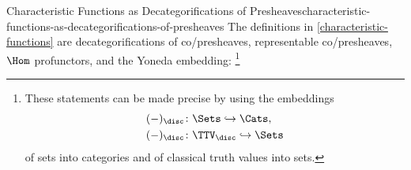\begin{remark}{Characteristic Functions as Decategorifications of Presheaves}{characteristic-functions-as-decategorifications-of-presheaves}%
    The definitions in \cref{characteristic-functions} are decategorifications of co/presheaves, representable co/presheaves, $\Hom$ profunctors, and the Yoneda embedding:%
    \footnote{%
        These statements can be made precise by using the embeddings
        \begin{align*}
            (-)_{\disc} &\colon \Sets       \hookrightarrow \Cats,\\
            (-)_{\disc} &\colon \TTV_{\disc} \hookrightarrow \Sets
        \end{align*}
        of sets into categories and of classical truth values into sets.

}
\end{remark}
